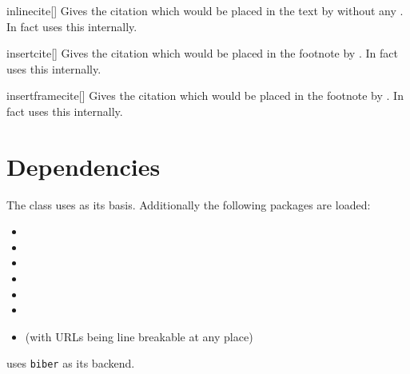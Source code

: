 \begin{describemacro}{inlinecite}[]
  Gives the citation which would be placed in the text by  without any
  . In fact  uses this internally.
\end{describemacro}

\begin{describemacro}{insertcite}[]
  Gives the citation which would be placed in the footnote by . In fact
   uses this internally.
\end{describemacro}

\begin{describemacro}{insertframecite}[]
  Gives the citation which would be placed in the footnote by . In
  fact  uses this internally.
\end{describemacro}

\section{Dependencies}
The class uses  as its basis. Additionally the following packages
are loaded:
\vspace*{-\multicolsep}%
\begin{multicols}{2}
  \begin{itemize}[leftmargin=10pt]
    \item {}
    \item {}
    \item {}
    \item {}
    \item {}
    \item \TikZ
    \item {} (with URLs being line breakable at any place)
  \end{itemize}
\end{multicols}
\vspace*{-\multicolsep}%
\noindent{} uses \texttt{biber} as its backend.
